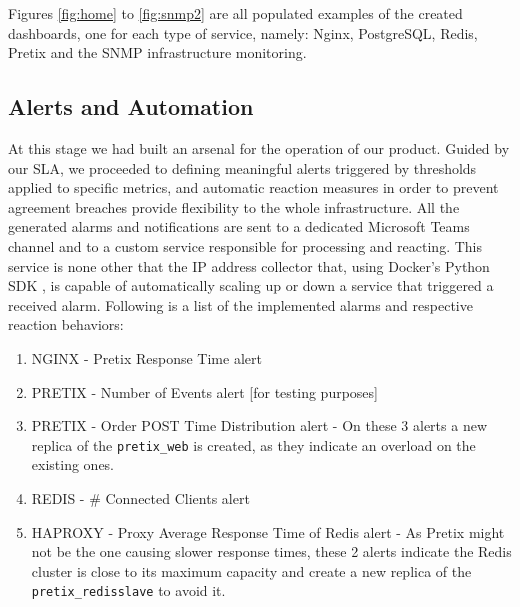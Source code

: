 \documentclass[12pt]{article}
\begin{document}
Figures \ref{fig:home} to \ref{fig:snmp2} are all populated examples of the created dashboards, one for each type of service, namely: 
Nginx, PostgreSQL, Redis, Pretix and the SNMP infrastructure monitoring.

\subsection{Alerts and Automation} \label{management.automation} %


At this stage we had built an arsenal for the operation of our product.
Guided by our SLA, we proceeded to defining meaningful alerts triggered by thresholds applied to specific metrics, and automatic reaction measures in order to
prevent agreement breaches provide flexibility to the whole infrastructure.
All the generated alarms and notifications are sent to a dedicated Microsoft Teams channel and to a custom service responsible for processing and reacting.
This service is none other that the IP address collector that, using Docker's Python SDK \cite{dockerpythonsdk}, is capable of automatically scaling up or down
a service that triggered a received alarm.
Following is a list of the implemented alarms and respective reaction behaviors:

\vspace{-10pt}
\begin{enumerate}[noitemsep]
  \item NGINX   - Pretix Response Time alert
  \item PRETIX  - Number of Events alert [for testing purposes]
  \item PRETIX  - Order POST Time Distribution alert          - On these 3 alerts a new replica of the \texttt{pretix\_web} is created, as they indicate an overload on the existing ones.
  \item REDIS   - \# Connected Clients alert
  \item HAPROXY - Proxy Average Response Time of Redis alert  - As Pretix might not be the one causing slower response times, these 2 alerts indicate the Redis cluster is close to its maximum capacity and create a new replica of the \texttt{pretix\_redisslave} to avoid it.
\end{enumerate}
\vspace{-10pt}
\end{document}
